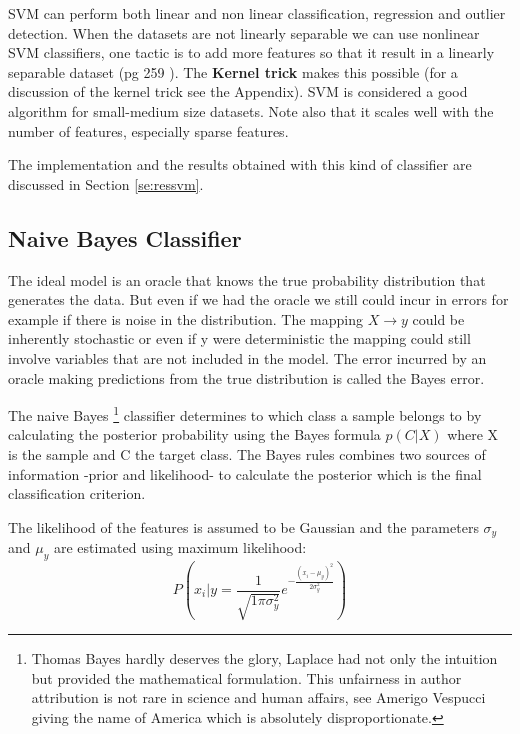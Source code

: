 \documentclass[11pt]{article}
\begin{document}
SVM can perform both linear and non linear classification, regression and outlier detection. When the datasets are not linearly separable we can use nonlinear SVM classifiers, one tactic is to add more features so that it result in a linearly separable dataset (pg 259 \cite{geron2017hands}). The \textbf{Kernel trick} makes this possible (for a discussion of the kernel trick see the Appendix). SVM is considered a good algorithm for small-medium size datasets. Note also that it scales well with the number of features, especially sparse features. 

The implementation and the results obtained with this kind of classifier are discussed in Section \ref{se:ressvm}.

\subsection{Naive Bayes Classifier}
\label{sse:naivebayes}
The ideal model is an oracle that knows the true probability distribution that generates the data. But even if we had the oracle we still could incur in errors for example if there is noise in the distribution.
The mapping $X \to y$ could be inherently stochastic or even if y were deterministic the mapping could still involve variables that are not included in the model. The error incurred by an oracle making predictions from the true distribution is called the Bayes error.

The naive Bayes \footnote{Thomas Bayes hardly deserves the glory, Laplace had not only the intuition but provided the mathematical formulation. This unfairness in author attribution is not rare in science and human affairs, see Amerigo Vespucci giving the name of America which is absolutely disproportionate.} classifier determines to which class a sample belongs to by calculating the posterior probability using the Bayes formula $p(C|X)$ where X is the sample and C the target class.
The Bayes rules combines two sources of information -prior and likelihood- to calculate the posterior which is the final classification criterion. 

The likelihood of the features is assumed to be Gaussian and the parameters $\sigma_y$ and $\mu_y$ are estimated using maximum likelihood:
\begin{equation} \label{eq:naiveb}
P(x_i|y= \frac{1}{\sqrt{1\pi\sigma_y^{2}}}e^{-\frac{(x_i-\mu_y)^2}{2\sigma_y^2}})
\end{equation}
\end{document}
